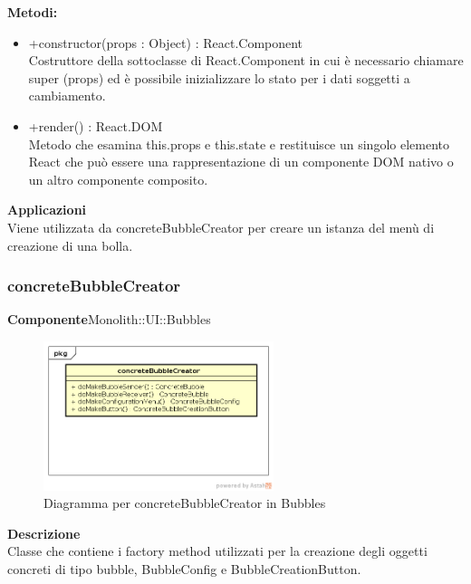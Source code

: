 \textbf{Metodi:} \begin{itemize}\item +constructor(props : Object) : React.Component \\Costruttore della sottoclasse di React.Component in cui è necessario chiamare super (props) ed è possibile inizializzare lo stato per i dati soggetti a cambiamento. 

\item +render() : React.DOM \\Metodo che esamina this.props e this.state e restituisce un singolo elemento React che può essere una rappresentazione di un componente DOM nativo o un altro componente composito.\end{itemize} 


\textbf{Applicazioni}\\
Viene utilizzata da concreteBubbleCreator per creare un istanza del menù di creazione di una bolla. 


\clearpage

\subsubsection{concreteBubbleCreator}
\textbf{Componente}Monolith::UI::Bubbles\\
   \FloatBarrier
   \begin{figure}[ht]
   \centering
   \includegraphics[width=0.6\textwidth]{img/single-concreteBubbleCreator}
   \caption{{Diagramma per concreteBubbleCreator in Bubbles}}
\end{figure}
\FloatBarrier
\textbf{Descrizione}\\
Classe che contiene i factory method utilizzati per la creazione degli oggetti concreti di tipo bubble, BubbleConfig e BubbleCreationButton.

